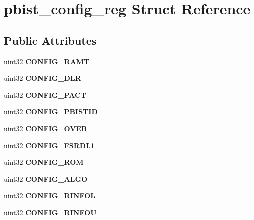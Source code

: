 \hypertarget{structpbist__config__reg}{}\section{pbist\+\_\+config\+\_\+reg Struct Reference}
\label{structpbist__config__reg}
\subsection*{Public Attributes}
\begin{DoxyCompactItemize}
\item 
\mbox{\label{structpbist__config__reg_aa63ffe05617711ab73fd50e94ca64dc0}} 
uint32 {\bfseries C\+O\+N\+F\+I\+G\+\_\+\+R\+A\+MT}
\item 
\mbox{\label{structpbist__config__reg_ab1e34764d001340d81047e5ffbea1325}} 
uint32 {\bfseries C\+O\+N\+F\+I\+G\+\_\+\+D\+LR}
\item 
\mbox{\label{structpbist__config__reg_a3589bba4b4b8e8680ce478cf46a42dbc}} 
uint32 {\bfseries C\+O\+N\+F\+I\+G\+\_\+\+P\+A\+CT}
\item 
\mbox{\label{structpbist__config__reg_a164e73c8d1952dc709f23c11308a7501}} 
uint32 {\bfseries C\+O\+N\+F\+I\+G\+\_\+\+P\+B\+I\+S\+T\+ID}
\item 
\mbox{\label{structpbist__config__reg_a9a87de0c4e60f130afe0247a609e87c0}} 
uint32 {\bfseries C\+O\+N\+F\+I\+G\+\_\+\+O\+V\+ER}
\item 
\mbox{\label{structpbist__config__reg_a5d8fa9405883ba070ab85decf5cab12d}} 
uint32 {\bfseries C\+O\+N\+F\+I\+G\+\_\+\+F\+S\+R\+D\+L1}
\item 
\mbox{\label{structpbist__config__reg_aabe509f69585bbcb896b9daf281efa37}} 
uint32 {\bfseries C\+O\+N\+F\+I\+G\+\_\+\+R\+OM}
\item 
\mbox{\label{structpbist__config__reg_a1990b9541eaa59eed7e4bab6b970d129}} 
uint32 {\bfseries C\+O\+N\+F\+I\+G\+\_\+\+A\+L\+GO}
\item 
\mbox{\label{structpbist__config__reg_af60878b58564b7ff595f089740f9e47b}} 
uint32 {\bfseries C\+O\+N\+F\+I\+G\+\_\+\+R\+I\+N\+F\+OL}
\item 
\mbox{\label{structpbist__config__reg_a80890337262915ad6f61e139693480c5}} 
uint32 {\bfseries C\+O\+N\+F\+I\+G\+\_\+\+R\+I\+N\+F\+OU}
\end{DoxyCompactItemize}


